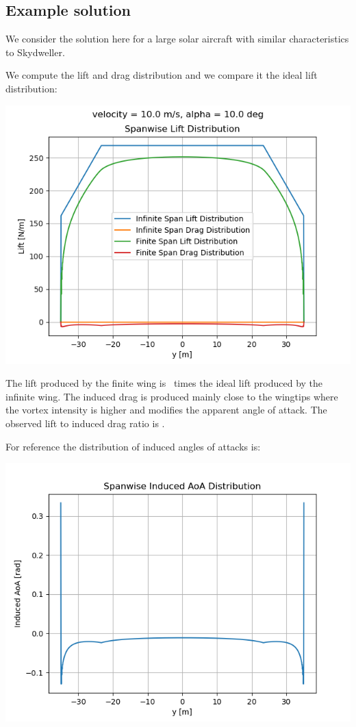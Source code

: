 \subsection{Example solution}
We consider the solution here for a large solar aircraft with similar characteristics to Skydweller.

We compute the lift and drag distribution and we compare it the ideal lift distribution:

\includegraphics[width=\textwidth]{input/ex_lift_drag_distribution.png}



The lift produced by the finite wing is \liftratio \  times the ideal lift produced by the infinite wing. The induced drag is produced mainly close to the wingtips where the vortex intensity is higher and modifies the apparent angle of attack. The observed lift to induced drag ratio is \lifttodrag.

For reference the distribution of induced angles of attacks is:

\includegraphics[width=\textwidth]{input/ex_induced_alpha.png}
